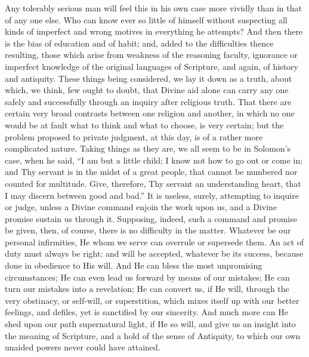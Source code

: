 Any tolerably serious man will feel this in his own case more
vividly than in that of any one else. Who can know ever so little of
himself without suspecting all kinds of imperfect and wrong motives in
everything he attempts? And then there is the bias of education and of
habit; and, added to the difficulties thence resulting, those which
arise from weakness of the reasoning faculty, ignorance or imperfect
knowledge of the original languages of Scripture, and again, of
history and antiquity. These things being considered, we lay it down
as a truth, about which, we think, few ought to doubt, that Divine aid
alone can carry any one safely and successfully through an inquiry
after religious truth. That there are certain very broad contrasts
between one religion and another, in which no one would be at fault
what to think and what to choose, is very certain; but the problem
proposed to private judgment, at this day, is of a rather more
complicated nature. Taking things as they are, we all seem to be in
Solomon's case, when he said, ``I am but a little child; I know
not how to go out or come in; and Thy servant is in the midst of a
great people, that cannot be numbered nor counted for multitude. Give,
therefore, Thy servant an understanding heart, that I may discern
between good and bad.'' It is useless, surely, attempting to
inquire or judge, unless a Divine command enjoin the work upon us, and
a Divine promise sustain us through it. Supposing, indeed, such a
command and promise be given, then, of course, there is no difficulty
in the matter. Whatever be our personal infirmities, He whom we serve
can overrule or supersede them. An act of duty must always be right;
and will be accepted, whatever be its success, because done in
obedience to His will. And He can bless the most unpromising
circumstances; He can even lead us forward by means of our mistakes;
He can turn our mistakes into a revelation; He can convert us, if He
will, through the very obstinacy, or self-will, or superstition, which
mixes itself up with our better feelings, and defiles, yet is
sanctified by our sincerity. And much more can He shed upon our path
supernatural light, if He so will, and give us an insight into the
meaning of Scripture, and a hold of the sense of Antiquity, to
which our own unaided powers never could have attained.


